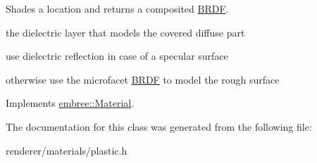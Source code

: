 Shades a location and returns a composited \hyperlink{classembree_1_1_b_r_d_f}{BRDF}. 



the dielectric layer that models the covered diffuse part

use dielectric reflection in case of a specular surface

otherwise use the microfacet \hyperlink{classembree_1_1_b_r_d_f}{BRDF} to model the rough surface 



Implements \hyperlink{classembree_1_1_material_a371ca178d6cc226c3d6c758cb41f8cef}{embree::Material}.



The documentation for this class was generated from the following file:\begin{DoxyCompactItemize}
\item 
renderer/materials/plastic.h\end{DoxyCompactItemize}
